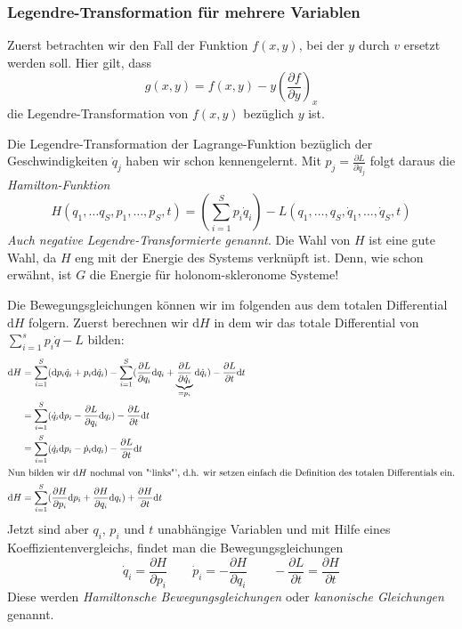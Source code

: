 \documentclass[oneside]{book}
\theoremstyle{definition}
\renewcommand{\d}{\mathrm d}
\newcommand{\md}{\d}
\begin{document}
\subsubsection{Legendre-Transformation für mehrere Variablen}
Zuerst betrachten wir den Fall der Funktion $f(x,y)$, bei der $y$ durch $v$ ersetzt werden soll. Hier gilt, dass
\[g(x,y) = f(x,y) - y(\frac{\partial f}{\partial y})_x\]
die Legendre-Transformation von $f(x,y)$ bezüglich $y$ ist.

Die Legendre-Transformation der Lagrange-Funktion bezüglich der Geschwindigkeiten $\dot q_j$ haben wir schon kennengelernt. Mit $p_j = \frac{\partial L}{\partial \dot q_j}$ folgt daraus die \emph{Hamilton-Funktion}
\[H(q_1,\ldots q_S,  p_1,\ldots, p_S,t) = (\sum\limits_{i=1}^S p_i \dot q_i) - L(q_1, \ldots,q_S, \dot q_1, \ldots, \dot q_S, t)\]
\textit{Auch negative Legendre-Transformierte genannt}.
Die Wahl von $H$ ist eine gute Wahl, da $H$ eng mit der Energie des Systems verknüpft ist. Denn, wie schon erwähnt, ist $G$ die Energie für holonom-skleronome Systeme!

Die Bewegungsgleichungen können wir im folgenden aus dem totalen Differential $\md H$ folgern.
Zuerst berechnen wir $\d H$ in dem wir das totale Differential von $\sum_{i=1}^s p_i \dot{q} - L$ bilden:
\begin{align*}
\md H &= \sum\limits_{i=1}^S (\md p_i \dot q_i + p_i \md \dot q_i) - \sum\limits_{i=1}^S (\frac{\partial L}{\partial q_i} \md q_i + \underbrace{\frac{\partial L}{\partial \dot q_i}}_{=p_i} \md \dot q_i) - \frac{\partial L}{\partial t} \md t\\
&=\sum\limits_{i=1}^S(\dot q_i \md p_i - \frac{\partial L}{\partial q_i}\md q_i) - \frac{\partial L}{\partial t}\md t\\
&=\sum\limits_{i=1}^S(\dot q_i \md p_i - \dot p_i\md q_i) - \frac{\partial L}{\partial t}\md t\\
\intertext{Nun bilden wir $\d H$ nochmal von "`links"', d.h. wir setzen einfach die Definition des totalen Differentials ein.}
\d H &= \sum\limits_{i=1}^S(\frac{\partial H}{\partial p_i}\md p_i + \frac{\partial H}{\partial q_i}\md q_i) + \frac{\partial H}{\partial t}\md t\\
\end{align*}
Jetzt sind aber $q_i$, $p_i$ und $t$ unabhängige Variablen und mit Hilfe eines Koeffizientenvergleichs, findet man die Bewegungsgleichungen
\[\dot q_i = \frac{\partial H}{\partial p_i}\qquad \dot p_i = - \frac{\partial H}{\partial q_i} \qquad -\frac{\partial L}{\partial t} = \frac{\partial H}{\partial t}\]
Diese werden \emph{Hamiltonsche Bewegungsgleichungen} oder \emph{kanonische Gleichungen} genannt.
\end{document}
